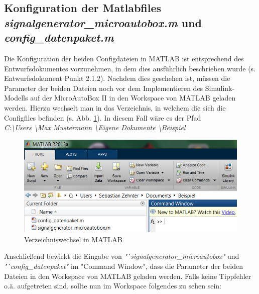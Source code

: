 \documentclass[fontsize = 12pt, paper = a4]{scrreprt}
\begin{document}
\subsection{Konfiguration der Matlabfiles \textit{signalgenerator\_microautobox.m} und \textit{config\_datenpaket.m}}

Die Konfiguration der beiden Configdateien in MATLAB ist entsprechend des Entwurfsdokumentes vorzunehmen, in dem dies ausführlich beschrieben wurde (s. Entwurfsdokument Punkt 2.1.2). Nachdem dies geschehen ist, müssen die Parameter der beiden Dateien noch vor dem Implementieren des Simulink-Modells auf der MicroAutoBox II in den Workspace von MATLAB geladen werden. Hierzu wechselt man in das Verzeichnis, in welchem die sich die Configfiles befinden (s. Abb. \ref{configfilespfad}). In diesem Fall wäre es der Pfad \\ \textit{C:\textbackslash Users \textbackslash Max Mustermann \textbackslash Eigene Dokumente \textbackslash Beispiel}


\begin{figure}[h]
\centering
\includegraphics[scale = 0.65]{configfilespfad}
\caption[Verzeichniswechsel in MATLAB]{Verzeichniswechsel in MATLAB}
\label{configfilespfad}
\end{figure} 

Anschließend bewirkt die Eingabe von \textit{"`signalgenerator\_microautobox"} und \textit{"`config\_datenpaket"} im "Command Window", dass die Parameter der beiden Dateien in den Workspace von MATLAB geladen werden. Falls keine Tippfehler o.ä. aufgetreten sind, sollte nun im Workspace folgendes zu sehen sein: 
\end{document}
